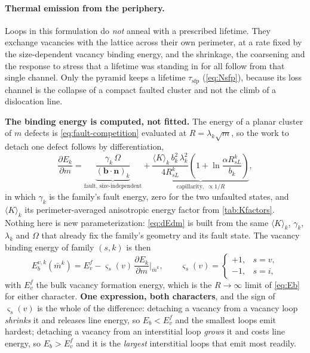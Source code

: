 \documentclass{article}
\newcommand{\bvec}{\bm b}
\newcommand{\nvec}{\bm n}
\begin{document}
\paragraph{Thermal emission from the periphery.} Loops in this formulation do
\emph{not} anneal with a prescribed lifetime. They exchange vacancies with the
lattice across their own perimeter, at a rate fixed by the size-dependent vacancy
binding energy, and the shrinkage, the coarsening and the response to stress that
a lifetime was standing in for all follow from that single channel. Only the
pyramid keeps a lifetime $\tau_{\mathrm{sfp}}$ (\cref{eq:Nsfp}), because its loss
channel is the collapse of a compact faulted cluster and not the climb of a
dislocation line.

\textbf{The binding energy is computed, not fitted.} The energy of a planar
cluster of $m$ defects is \cref{eq:fault-competition} evaluated at
$R=\lambda_k\sqrt m$, so the work to detach one defect follows by
differentiation,
\begin{equation}
  \frac{\partial E_k}{\partial m}
  =\underbrace{\frac{\gamma_k\,\Omega}{(\bvec\!\cdot\!\nvec)_k}}_{\text{fault, size-independent}}
  +\underbrace{\frac{\langle K\rangle_k\,b_k^{2}\,\lambda_k^{2}}{4R^k_{sL}}
      \left(1+\ln\frac{\alpha R^k_{sL}}{b_k}\right)}_{\text{capillarity},\;\propto 1/R},
  \label{eq:dEdm}
\end{equation}
in which $\gamma_k$ is the family's fault energy, zero for the two unfaulted
states, and $\langle K\rangle_k$ its perimeter-averaged anisotropic energy factor
from \cref{tab:Kfactors}. Nothing here is new parameterization: \cref{eq:dEdm} is
built from the same $\langle K\rangle_k$, $\gamma_k$, $\lambda_k$ and $\Omega$
that already fix the family's geometry and its fault state. The vacancy binding
energy of family $(s,k)$ is then
\begin{equation}
  E^{v,k}_b(\bar m^k)=E^{f}_{v}-\varsigma_s(v)\,
    \frac{\partial E_k}{\partial m}\bigg|_{\bar m^k},
  \qquad
  \varsigma_s(v)=\begin{cases}+1,& s=v,\\ -1,& s=i,\end{cases}
  \label{eq:Eb}
\end{equation}
with $E^f_v$ the bulk vacancy formation energy, which is the $R\to\infty$ limit
of \cref{eq:Eb} for either character. \textbf{One expression, both characters},
and the sign of $\varsigma_s(v)$ is the whole of the difference: detaching a
vacancy from a vacancy loop \emph{shrinks} it and releases line energy, so
$E_b<E^f_v$ and the smallest loops emit hardest; detaching a vacancy from an
interstitial loop \emph{grows} it and costs line energy, so $E_b>E^f_v$ and it is
the \emph{largest} interstitial loops that emit most readily.
\end{document}
